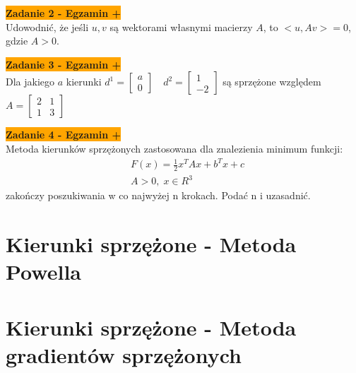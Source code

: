 \documentclass[a4paper,11pt]{article}
\begin{document}
\begin{framed}
\textbf{\colorbox{orange}{Zadanie 2 - Egzamin +}} \\
Udowodnić, że jeśli \( u, v \) są wektorami własnymi macierzy \( A \), to \( <u,Av>=0 \), gdzie \( A > 0 \). 
\end{framed}

\begin{framed}
\textbf{\colorbox{orange}{Zadanie 3 - Egzamin +}} \\
Dla jakiego \( a \) kierunki \( d^1 = \begin{bmatrix}
a \\ 0 
\end{bmatrix} \quad d^2=\begin{bmatrix}
1 \\ -2 
\end{bmatrix} \) są sprzężone względem \( A = \begin{bmatrix}
2 & 1 \\ 1 & 3 
\end{bmatrix}
\)
\end{framed}


\begin{framed}
\textbf{\colorbox{orange}{Zadanie 4 - Egzamin +}} \\
Metoda kierunków  sprzężonych zastosowana dla znalezienia minimum  funkcji: 
\begin{align*}
&F(x)=\frac{1}{2}x^TAx+b^Tx+c \\
&A > 0, \; x \in R^3
\end{align*}
zakończy poszukiwania w co najwyżej n krokach. Podać n  i uzasadnić. 
\end{framed}










\newpage
\section{Kierunki sprzężone - Metoda Powella}










\newpage
\section{Kierunki sprzężone - Metoda gradientów sprzężonych}
\end{document}
